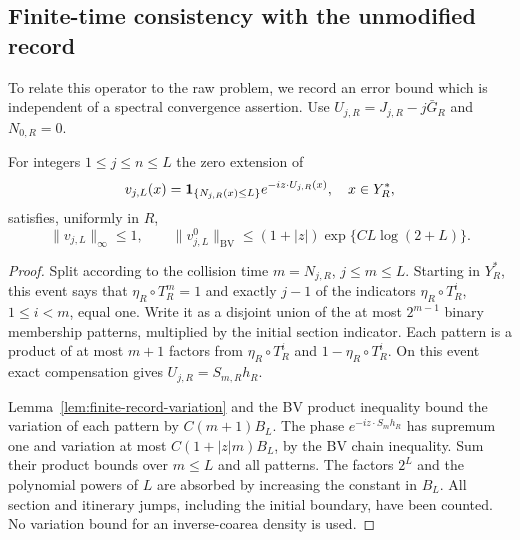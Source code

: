 \subsection{Finite-time consistency with the unmodified record}
To relate this operator to the raw problem, we record an error bound
which is independent of a spectral convergence assertion. Use
$U_{j,R}=J_{j,R}-j\bar G_R$ and $N_{0,R}=0$.

\begin{lemma}
\label{lem:truncated-return-phase-variation}
For integers $1\le j\le n\le L$ the zero extension of
\[
 v_{j,L}(x)=\mathbf1_{\{N_{j,R}(x)\le L\}}
                                  e^{-iz\cdot U_{j,R}(x)},\quad x\in Y_R^*,
\]
satisfies, uniformly in $R$,
\begin{equation}\label{eq:truncated-return-phase-variation}
 \|v_{j,L}\|_\infty\le1,\qquad
 \|v_{j,L}^0\|_{\mathrm{BV}}
                     \le(1+|z|)\exp\{C L\log(2+L)\}.
\end{equation}
\end{lemma}
\begin{proof}
Split according to the collision time $m=N_{j,R}$, $j\le m\le L$.
Starting in $Y_R^*$, this event says that
$\eta_R\circ T_R^m=1$ and exactly $j-1$ of the indicators
$\eta_R\circ T_R^i$, $1\le i<m$, equal one.
Write it as a disjoint union of the at most $2^{m-1}$ binary
membership patterns, multiplied by the initial section indicator.
Each pattern is a product of at most $m+1$ factors from
$\eta_R\circ T_R^i$ and $1-\eta_R\circ T_R^i$.
On this event exact compensation gives $U_{j,R}=S_{m,R}h_R$.

Lemma~\ref{lem:finite-record-variation} and the BV product inequality
bound the variation of each pattern by $C(m+1)B_L$. The phase
$e^{-iz\cdot S_mh_R}$ has supremum one and variation at most
$C(1+|z|m)B_L$, by the BV chain inequality. Sum their product bounds
over $m\le L$ and all patterns. The factors $2^L$ and the polynomial
powers of $L$ are absorbed by increasing the constant in $B_L$.
All section and itinerary jumps, including the initial boundary, have
been counted. No variation bound for an inverse-coarea density is
used.
\end{proof}

